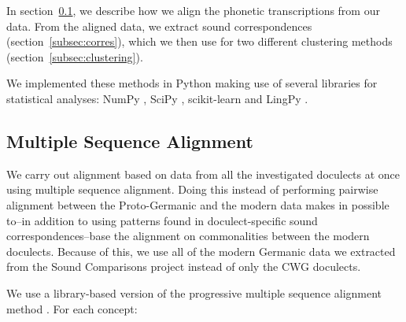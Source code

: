 \documentclass[a4paper]{article}
\begin{document}
In section~\ref{subsec:msa}, we describe how we align
the phonetic transcriptions from our data.
From the aligned data, we extract sound correspondences
(section~\ref{subsec:corres}), which we then use for
two different clustering methods (section~\ref{subsec:clustering}).

We implemented these methods in Python
making use of several libraries for statistical analyses:
NumPy \citep{oliphant2006guide}, SciPy \citep{jones2001scipy},
scikit-learn \citep{pedregosa2011scikit-learn} and LingPy \citep{list2018lingpy}.

\subsection{Multiple Sequence Alignment}
\label{subsec:msa}

We carry out alignment based on data from
all the investigated doculects at once using multiple sequence alignment.
Doing this instead of performing pairwise alignment between
the Proto-Germanic and the modern data makes in possible
to--in addition to using patterns found in doculect-specific
sound correspondences--base the alignment on commonalities
between the modern doculects.
Because of this, we use all of the modern Germanic data
we extracted from the Sound Comparisons project
instead of only the CWG doculects.

We use a library-based version \citep{notredame2000t-coffee:} of the progressive multiple sequence alignment method \citep{thompson1994clustal}.
For each concept:
\end{document}
